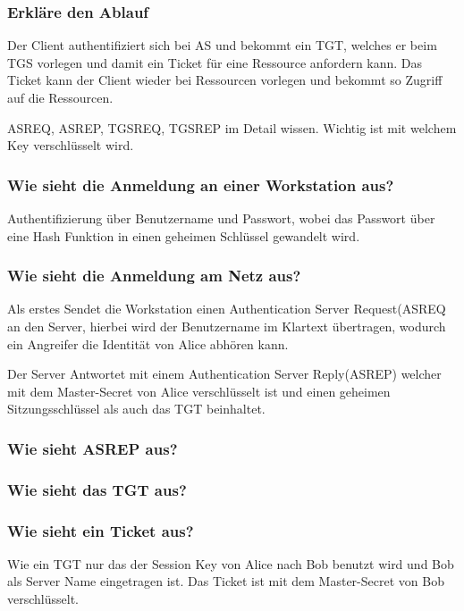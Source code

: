	\subsubsection{Erkläre den Ablauf}
	Der Client authentifiziert sich bei AS und bekommt ein TGT, welches er beim TGS vorlegen und damit ein Ticket für eine Ressource anfordern kann. Das Ticket kann der Client wieder bei Ressourcen vorlegen und bekommt so Zugriff auf die Ressourcen.
	
	AS\textunderscore REQ, AS\textunderscore REP, TGS\textunderscore REQ, TGS\textunderscore REP im Detail wissen. Wichtig ist mit welchem Key verschlüsselt wird. %
	
	\subsubsection{Wie sieht die Anmeldung an einer Workstation aus?}
	Authentifizierung über Benutzername und Passwort, wobei das Passwort über eine Hash Funktion in einen geheimen Schlüssel gewandelt wird.
	
	\subsubsection{Wie sieht die Anmeldung am Netz aus?}
	Als erstes Sendet die Workstation einen Authentication Server Request(AS\textunderscore REQ an den Server, hierbei wird der Benutzername im Klartext übertragen, wodurch ein Angreifer die Identität von Alice abhören kann.


	
	Der Server Antwortet mit einem Authentication Server Reply(AS\textunderscore REP) welcher mit dem Master-Secret von Alice verschlüsselt ist und einen geheimen Sitzungsschlüssel als auch das TGT beinhaltet.
	
	\subsubsection{Wie sieht AS\textunderscore REP aus?}

	
	\subsubsection{Wie sieht das TGT aus?}

		
	\subsubsection{Wie sieht ein Ticket aus?}
	Wie ein TGT nur das der Session Key von Alice nach Bob benutzt wird und Bob als Server Name eingetragen ist. Das Ticket ist mit dem Master-Secret von Bob verschlüsselt.
